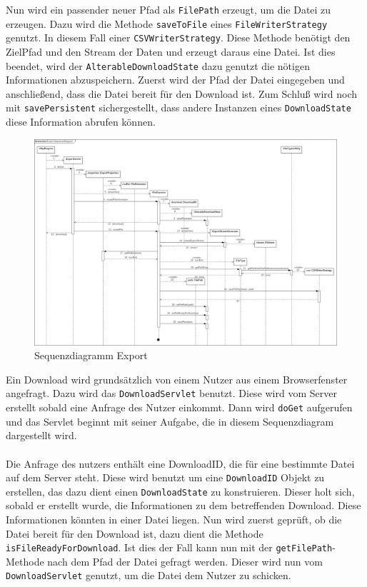 Nun wird ein passender neuer Pfad als \texttt{FilePath} erzeugt, um die Datei zu erzeugen. Dazu wird die Methode \texttt{saveToFile} eines \texttt{FileWriterStrategy} genutzt. In diesem Fall einer \texttt{CSVWriterStrategy}. Diese Methode benötigt den ZielPfad und den Stream der Daten und erzeugt daraus eine Datei. Ist dies beendet, wird der \texttt{AlterableDownloadState} dazu genutzt die nötigen Informationen abzuspeichern. Zuerst wird der Pfad der Datei eingegeben und anschließend, dass die Datei bereit für den Download ist. Zum Schluß wird noch mit \texttt{savePersistent} sichergestellt, dass andere Instanzen eines \texttt{DownloadState} diese Information abrufen können.
\begin{figure}[!hbp]
	\centering
	\includegraphics[width=1.25\linewidth,angle=90]{images/export/ExportSequenceDiagram.png}
	\caption{Sequenzdiagramm Export}
\end{figure}
\newpage
Ein Download wird grundsätzlich von einem Nutzer aus einem Browserfenster angefragt. Dazu wird das \texttt{DownloadServlet} benutzt. Diese wird vom Server erstellt sobald eine Anfrage des Nutzer einkommt. Dann wird \texttt{doGet} aufgerufen und das Servlet beginnt mit seiner Aufgabe, die in diesem Sequenzdiagram dargestellt wird.\\\\
Die Anfrage des nutzers enthält eine DownloadID, die für eine bestimmte Datei auf dem Server steht. Diese wird benutzt um eine \texttt{DownloadID} Objekt zu erstellen, das dazu dient einen \texttt{DownloadState} zu konstruieren. Dieser holt sich, sobald er erstellt wurde, die Informationen zu dem betreffenden Download. Diese Informationen könnten in einer Datei liegen. Nun wird zuerst geprüft, ob die Datei bereit für den Download ist, dazu dient die Methode \texttt{isFileReadyForDownload}. Ist dies der Fall kann nun mit der \texttt{getFilePath}-Methode nach dem Pfad der Datei gefragt werden. Dieser wird nun vom \texttt{DownloadServlet} genutzt, um die Datei dem Nutzer zu schicken.\\\\
